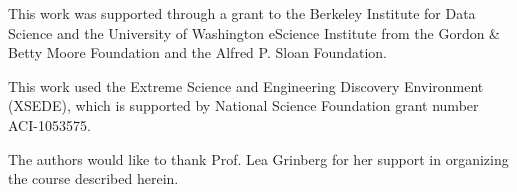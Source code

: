 




\begin{acks}

This work was supported through a grant to the Berkeley Institute for Data
Science and the University of Washington eScience Institute from the Gordon \&
Betty Moore Foundation and the Alfred P. Sloan Foundation.

This work used the Extreme Science and Engineering Discovery Environment
(XSEDE), which is supported by National Science Foundation grant number
ACI-1053575.

The authors would like to thank Prof. Lea Grinberg for her support in organizing the course described herein.

\end{acks}
